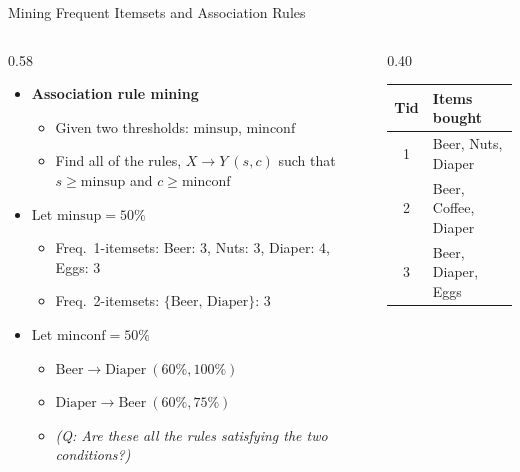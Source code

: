 \documentclass[aspectratio=169, 11pt]{beamer}
\begin{document}
\begin{frame}{Mining Frequent Itemsets and Association Rules}
    \begin{columns}[T]
        \begin{column}{0.58\textwidth}
            \small
            \begin{itemize}
                \item \textbf{Association rule mining}
                \begin{itemize}
                    \item Given two thresholds: $\text{minsup}$, $\text{minconf}$
                    \item Find all of the rules, $X \rightarrow Y\ (s, c)$ such that $s \ge \text{minsup}$ and $c \ge \text{minconf}$
                \end{itemize}
                \item Let $\text{minsup} = 50\%$
                \begin{itemize}
                    \item Freq.\ 1-itemsets: Beer: 3, Nuts: 3, Diaper: 4, Eggs: 3
                    \item Freq.\ 2-itemsets: $\{\text{Beer, Diaper}\}$: 3
                \end{itemize}
                \item Let $\text{minconf} = 50\%$
                \begin{itemize}
                    \item $\text{Beer} \rightarrow \text{Diaper}\ (60\%, 100\%)$
                    \item $\text{Diaper} \rightarrow \text{Beer}\ (60\%, 75\%)$
                    \item \textit{(Q: Are these all the rules satisfying the two conditions?)}
                \end{itemize}
            \end{itemize}
        \end{column}
        \begin{column}{0.40\textwidth}
            \centering
            \footnotesize
            \begin{tabular}{cl}
                \toprule
                \textbf{Tid} & \textbf{Items bought} \\
                \midrule
                1 & Beer, Nuts, Diaper \\
                2 & Beer, Coffee, Diaper \\
                3 & Beer, Diaper, Eggs \\

\end{tabular}
\end{column}
\end{columns}
\end{frame}
\end{document}
